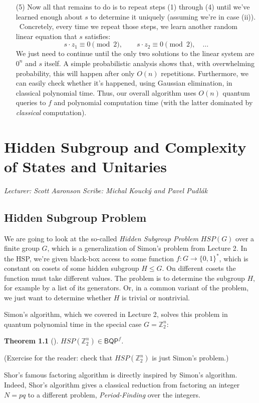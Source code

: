 \documentclass[11pt]{report}
\theoremstyle{plain}
\newtheorem{theorem}{Theorem}[section]
\theoremstyle{definition}
\newcommand{\Z}{{\mathbb Z}}
\newcommand{\lecture}[3]{%
  \chapter{#3}%
  \vspace{-5ex}%
  \textit{Lecturer: #1 \hfill Scribe: #2}\par%
  \vspace{1ex}\titlerule\vspace{2ex}}
\begin{document}
\begin{enumerate}
\item[(5)] Now all that remains to do is to repeat steps (1) through (4) until we've learned enough about $s$ to determine it uniquely (assuming we're in case (ii)). \ Concretely, every time we repeat those steps, we learn another random linear equation that $s$ satisfies:
    $$s\cdot z_1 \equiv 0 \pmod 2, \quad \quad s\cdot z_2 \equiv 0 \pmod 2, \quad \ldots$$
    We just need to continue until the only two solutions to the linear system are $0^n$ and $s$ itself. A simple probabilistic analysis shows that, with overwhelming probability, this will happen after only $O(n)$ repetitions. Furthermore, we can easily check whether it's happened, using Gaussian elimination, in classical polynomial time.  Thus, our overall algorithm uses $O(n)$ quantum queries to $f$ and polynomial computation time (with the latter dominated by {\em classical} computation).
\end{enumerate}


\lecture{Scott Aaronson}{Michal Kouck\'{y} and Pavel Pudl\'ak}{Hidden Subgroup and Complexity of States and Unitaries}

\section{Hidden Subgroup Problem}

We are going to look at the so-called {\em Hidden Subgroup Problem} $HSP(G)$ over a finite group $G$, which is a generalization of Simon's problem from Lecture 2.
In the HSP, we're given black-box
access to some function $f:G\rightarrow \{0,1\}^*$, which is constant on cosets of some hidden subgroup $H \le G$.
On different cosets the function must take different values. The problem is to determine the subgroup $H$, for example by a list of its generators.
Or, in a common variant of the problem, we just want to determine whether $H$ is trivial or nontrivial.

Simon's algorithm, which we covered in Lecture 2, solves this problem in quantum polynomial time in the special case $G=\Z^n_2$:

\begin{theorem}[\cite{simon}]
$HSP(\Z^n_2) \in \mathsf{BQP}^f$.
\end{theorem}

(Exercise for the reader: check that $HSP(\Z^n_2)$ is just Simon's problem.)

Shor's famous factoring algorithm is directly inspired by Simon's algorithm. Indeed, Shor's algorithm
gives a classical reduction from factoring an integer $N=pq$ to a different problem, {\em Period-Finding} over the integers.
\end{document}
